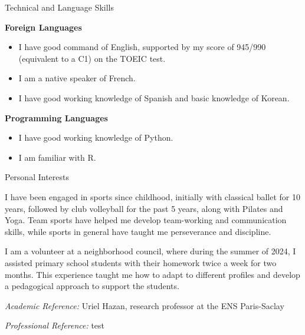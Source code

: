 \documentclass[
	10pt,
]{style} %
\begin{document}
\begin{rSection}{Technical and Language Skills}

	\textbf{Foreign Languages}
	\begin{itemize}[noitemsep, topsep=0pt, left=0pt]
		\item I have good command of English, supported by my score of 945/990 (equivalent to a C1) on the TOEIC test.
		\item I am a native speaker of French.
		\item I have good working knowledge of Spanish and basic knowledge of Korean.
	\end{itemize}
	\textbf{Programming Languages}
	\begin{itemize}[noitemsep, topsep=0pt, left=0pt]
		\item I have good working knowledge of Python.
		\item I am familiar with R.
	\end{itemize}

\end{rSection}



\begin{rSection}{Personal Interests}
	\vspace{-1em}
	\begin{rSubsection}{}{}{}{}
		\item I have been engaged in sports since childhood, initially with classical ballet for 10 years, followed by club volleyball for the past 5 years, along with Pilates and Yoga. Team sports have helped me develop team-working and communication skills, while sports in general have taught me perseverance and discipline.
		\item I am a volunteer at a neighborhood council, where during the summer of 2024, I assisted primary school students with their homework twice a week for two months. This experience taught me how to adapt to different profiles and develop a pedagogical approach to support the students.
	\end{rSubsection}

\end{rSection}



\begin{rReferences}
	\vspace{-0.5em}
    \item \textit{Academic Reference:} Uriel Hazan, research professor at the ENS Paris-Saclay
    \item \textit{Professional Reference:} test
\end{rReferences}
\end{document}
